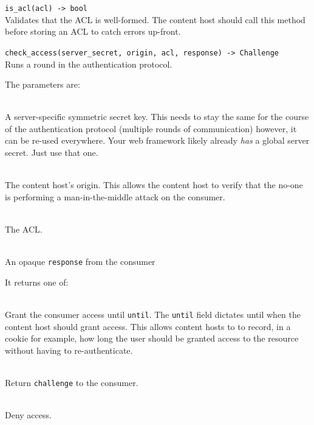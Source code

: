 \documentclass[pdftex,12pt,a4papaer,twoside,notitlepage]{report}
\begin{document}
\begin{compactitem}[$\lambda$]
\item \verb=is_acl(acl) -> bool= \\
  Validates that the ACL is well-formed. The content host should call this
  method before storing an ACL to catch errors up-front.
\item \verb=check_access(server_secret, origin, acl, response) -> Challenge= \\
  Runs a round in the authentication protocol.

  The parameters are:

  \begin{description}[labelindent=2em,leftmargin=4em]
  \item[\texttt{server\_secret}] \hfill \\
    A server-specific symmetric secret key. This needs to stay the same for the
    course of the authentication protocol (multiple rounds of communication)
    however, it can be re-used everywhere. Your web framework likely already
    \emph{has} a global server secret. Just use that one.
  \item[\texttt{origin}] \hfill \\
    The content host's origin. This allows the content host to verify that the
    no-one is performing a man-in-the-middle attack on the consumer.
  \item[\texttt{acl}] \hfill \\
    The ACL.
  \item[\texttt{response}] \hfill \\
    An opaque \texttt{response} from the consumer
  \end{description}

  It returns one of:

 \begin{description}[labelindent=2em,leftmargin=4em]
 \item[\texttt{Grant(until)}] \hfill \\
   Grant the consumer access until \texttt{until}. The \texttt{until} field
   dictates until when the content host should grant access. This allows content
   hosts to to record, in a cookie for example, how long the user should be
   granted access to the resource without having to re-authenticate.
 \item[\texttt{Continue(challenge)}] \hfill \\
   Return \texttt{challenge} to the consumer.
 \item[\texttt{Deny}] \hfill \\
   Deny access.
 \end{description}
\end{compactitem}
\end{document}
